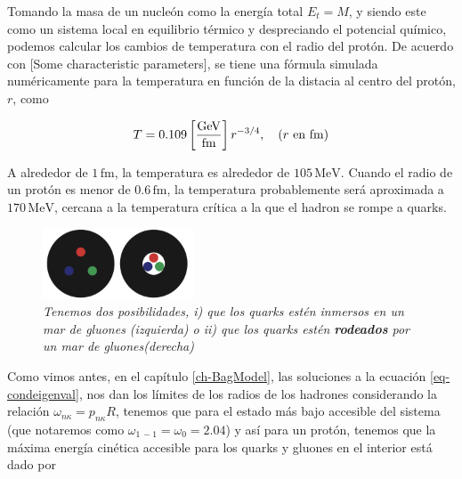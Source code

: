 Tomando la masa de un nucleón como la energía total ${E}_{t} = M$, y siendo este como un sistema local en equilibrio térmico y despreciando el potencial químico, podemos calcular los cambios de temperatura con el radio del protón. De acuerdo con [Some characteristic parameters], se tiene una fórmula simulada numéricamente para la temperatura en función de la distacia al centro del protón, $r$, como 

\begin{equation}\label{eq-T(r)}
T = 0.109\left[ \frac{\unit{GeV}}{\unit{\femto\meter}}\right] {r}^{-3/4}, \quad (r  \text{ en \unit{\femto\meter}})
\end{equation}

A alrededor de $1 \, \mathrm{\unit{\femto\meter}}$, la temperatura es alrededor de $105 \, \mathrm{MeV}$. Cuando el radio de un protón es menor de $0.6 \, \mathrm{\unit{\femto\meter}}$, la temperatura probablemente será aproximada a $170 \, \mathrm{MeV}$, cercana a la temperatura crítica a la que el hadron se rompe a quarks.

\begin{figure}
\centering
\includegraphics[width=0.4\textwidth]{./Images/Bag model-two scenaries.png}
\caption[Posibles estructuras del modelo de bolsa]{
 \emph{Tenemos dos posibilidades, i) que los quarks estén inmersos en un mar de gluones (izquierda) o ii) que los quarks estén \textbf{rodeados} \allowbreak por un mar de gluones(derecha)}}
\label{fig: 2Bag-models}
\end{figure}


Como vimos antes, en el capítulo \ref{ch-BagModel}, las soluciones a la ecuación \eqref{eq-condeigenval}, nos dan los límites de los radios de los hadrones considerando la relación ${\omega}_{n\kappa} = {p}_{n\kappa}{R}$, tenemos que para el estado más bajo accesible del sistema (que notaremos como ${\omega}_{1 \, -1} = {\omega}_{0} = 2.04$) y así para un protón, tenemos que la máxima energía cinética accesible para los quarks y gluones en el interior está dado por

